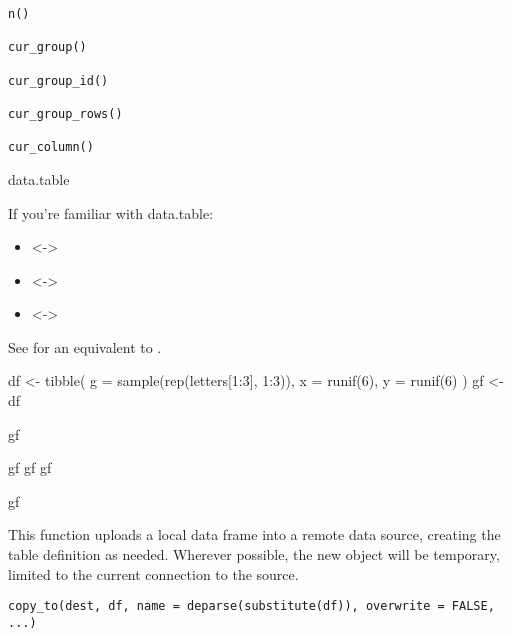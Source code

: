 \documentclass[a4paper]{book}
\begin{document}
%
\begin{Usage}
\begin{verbatim}
n()

cur_group()

cur_group_id()

cur_group_rows()

cur_column()
\end{verbatim}
\end{Usage}
%
\begin{Section}{data.table}

If you're familiar with data.table:
\begin{itemize}

\item{}  <-> 
\item{}  <-> 
\item{}  <-> 

\end{itemize}


See  for an equivalent to .
\end{Section}
%
\begin{Examples}
\begin{ExampleCode}
df <- tibble(
  g = sample(rep(letters[1:3], 1:3)),
  x = runif(6),
  y = runif(6)
)
gf <- df %

gf %

gf %
gf %
gf %

gf %
\end{ExampleCode}
\end{Examples}
%
\begin{Description}
This function uploads a local data frame into a remote data source, creating
the table definition as needed. Wherever possible, the new object will be
temporary, limited to the current connection to the source.
\end{Description}
%
\begin{Usage}
\begin{verbatim}
copy_to(dest, df, name = deparse(substitute(df)), overwrite = FALSE, ...)
\end{verbatim}
\end{Usage}
%
\end{document}
